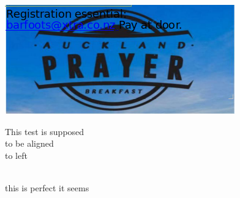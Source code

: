 \documentclass{article}
\begin{document}
\begin{minipage}{0.3\textwidth}
\includegraphics[width=\linewidth]{expectation.PNG}
\end{minipage}

\begin{minipage}{0.2\textwidth}
\end{minipage}

\begin{minipage}{0.5\textwidth}\raggedright
This test is supposed\\
to be aligned\\
to left\\
\end{minipage}
\noindent
\\
this is perfect it seems
\end{document}
